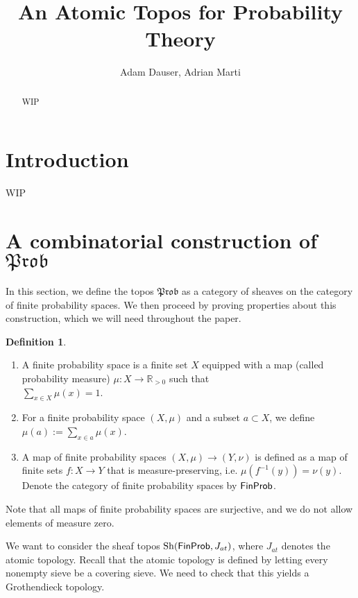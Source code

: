 \documentclass[a4paper]{amsproc}
\title{An Atomic Topos for Probability Theory}
\author{Adam Dauser, Adrian Marti}
\date{}
\theoremstyle{plain}
\theoremstyle{definition}
\newtheorem{definition}[theorem]{Definition}
\theoremstyle{remark}
\numberwithin{equation}{section}
\DeclareMathOperator{\Sh}{Sh}
\newcommand{\FinProb}{\textup{\textsf{FinProb}}}
\newcommand{\Prob}{\mathfrak{Prob}}
\begin{document}
\begin{abstract}
WIP
\end{abstract}

\maketitle

\tableofcontents


\section{Introduction}

WIP

\section{A combinatorial construction of $\Prob$}

In this section, we define the topos $\Prob$ as a category of sheaves on the category of finite probability spaces. We then proceed by proving properties about this construction, which we will need throughout the paper.


\begin{definition}
    \mbox{}
    \begin{enumerate}
        \item A finite probability space is a finite set $X$ equipped with a map (called probability measure) $\mu: X \to \mathbb{R}_{>0}$ such that \\ $\sum_{x \in X} \mu(x) = 1$.
        \item For a finite probability space $(X,\mu)$ and a subset $a \subset X$, we define $\mu(a) := \sum_{x \in a} \mu(x)$.
        \item A map of finite probability spaces $(X,\mu) \to (Y,\nu)$ is defined as a map of finite sets $f: X \to Y$ that is measure-preserving, i.e. $\mu(f^{-1}(y)) = \nu(y)$. Denote the category of finite probability spaces by $\FinProb$.
    \end{enumerate}
\end{definition}

Note that all maps of finite probability spaces are surjective, and we do not allow elements of measure zero.

We want to consider the sheaf topos $\Sh(\FinProb, J_{at})$, where $J_{at}$ denotes the atomic topology. Recall that the atomic topology is defined by letting every nonempty sieve be a covering sieve. We need to check that this yields a Grothendieck topology.
\end{document}
